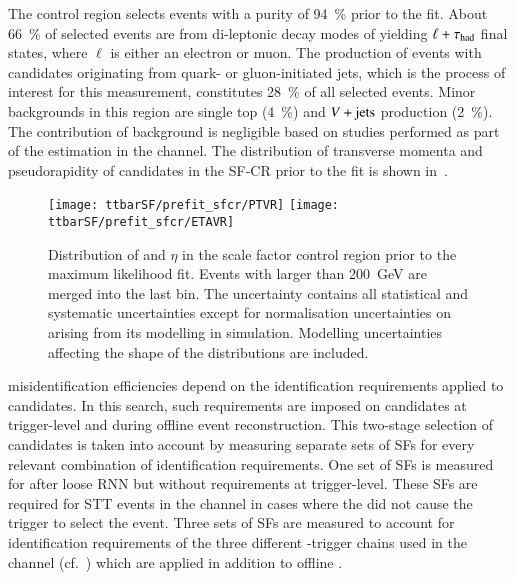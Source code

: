 The control region selects \ttbar events with a purity of
\SI{94}{\percent} prior to the fit. About \SI{66}{\percent} of
selected events are from di-leptonic decay modes of \ttbar yielding
$\ell + \tau_{\text{had}}$ final states, where $\ell$ is either an electron or
muon. The production of \ttbar events with \tauhadvis candidates
originating from quark- or gluon-initiated jets, which is the process
of interest for this measurement, constitutes \SI{28}{\percent} of all
selected events. Minor backgrounds in this region are single top
(\SI{4}{\percent}) and $V+\text{jets}$ production (\SI{2}{\percent}). The
contribution of \multijet background is negligible based on studies
performed as part of the \faketauhadvis estimation in the \lephad
channel. The distribution of transverse momenta and pseudorapidity of
\tauhadvis candidates in the SF-CR prior to the fit is shown
in~.

\begin{figure}[htbp]
  \centering

  \texttt{[image: ttbarSF/prefit\_sfcr/PTVR]}%
  \texttt{[image: ttbarSF/prefit\_sfcr/ETAVR]}

  \caption{Distribution of \tauhadvis \pT and $\eta$ in the scale
    factor control region prior to the maximum likelihood fit. Events
    with \tauhadvis \pT larger than \SI{200}{\GeV} are merged into the
    last bin. The uncertainty contains all statistical and systematic
    uncertainties except for normalisation uncertainties on \ttbar
    arising from its modelling in simulation. Modelling uncertainties
    affecting the shape of the distributions are included.}%
  \label{fig:ttbarSF_prefit_pt}
\end{figure}

\Jettotauhadvis misidentification efficiencies depend on the identification
requirements applied to \tauhadvis candidates. In this search, such requirements
are imposed on \tauhadvis candidates at trigger-level and during offline event
reconstruction. This two-stage selection of \tauhadvis candidates is taken into
account by measuring separate sets of SFs for every relevant combination of
identification requirements. One set of SFs is measured for \faketauhadvis after
loose RNN \tauid but without requirements at trigger-level. These SFs are
required for STT events in the \hadhad channel in cases where the \faketauhadvis
did not cause the trigger to select the event. Three sets of SFs are measured to
account for identification requirements of the three different
\tauhadvis-trigger chains used in the \hadhad channel
(cf.~) which are applied in addition to
offline \tauid.

